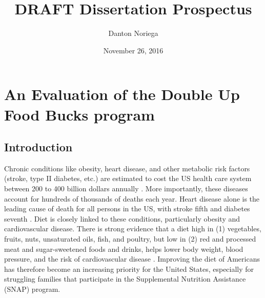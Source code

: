 \documentclass[12pt,letterpaperpaper,]{book}
\title{DRAFT Dissertation Prospectus}
\author{Danton Noriega}
\date{November 26, 2016}
\begin{document}
\maketitle

\setlength{\abovedisplayskip}{-5pt}
\setlength{\abovedisplayshortskip}{-5pt}
\mainmatter

{
\setcounter{tocdepth}{2}
\tableofcontents
}
\chapter{An Evaluation of the Double Up Food Bucks
program}\label{chapter-1}

\section*{Introduction}\label{intro-1}

Chronic conditions like obesity, heart disease, and other metabolic risk
factors (stroke, type II diabetes, etc.) are estimated to cost the US
health care system between 200 to 400 billion dollars annually
\citep{cawley_medical_2012, chatterjee_checkup_2014}. More importantly,
these diseases account for hundreds of thousands of deaths each year.
Heart disease alone is the leading cause of death for all persons in the
US, with stroke fifth and diabetes seventh
\citep{national_center_for_health_statistics_health_2015}. Diet is
closely linked to these conditions, particularly obesity and
cardiovascular disease. There is strong evidence that a diet high in (1)
vegetables, fruits, nuts, unsaturated oils, fish, and poultry, but low
in (2) red and processed meat and sugar-sweetened foods and drinks,
helps lower body weight, blood pressure, and the risk of cardiovascular
disease
\citep{mente_systematic_2009, nutrition_evidence_library_series_2014}.
Improving the diet of Americans has therefore become an increasing
priority for the United States, especially for struggling families that
participate in the Supplemental Nutrition Assistance (SNAP) program.
\end{document}
